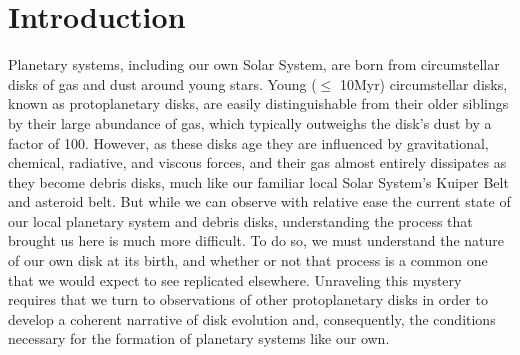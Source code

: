\chapter{Introduction}
\label{chap:introduction}

%


Planetary systems, including our own Solar System, are born from circumstellar disks of gas and dust around young stars. Young ($\leq$ 10Myr) circumstellar disks, known as protoplanetary disks, are easily distinguishable from their older siblings by their large abundance of gas, which typically outweighs the disk's dust by a factor of 100. However, as these disks age they are influenced by gravitational, chemical, radiative, and viscous forces, and their gas almost entirely dissipates as they become debris disks, much like our familiar local Solar System's Kuiper Belt and asteroid belt. But while we can observe with relative ease the current state of our local planetary system and debris disks, understanding the process that brought us here is much more difficult. To do so, we must understand the nature of our own disk at its birth, and whether or not that process is a common one that we would expect to see replicated elsewhere. Unraveling this mystery requires that we turn to observations of other protoplanetary disks in order to develop a coherent narrative of disk evolution and, consequently, the conditions necessary for the formation of planetary systems like our own.

